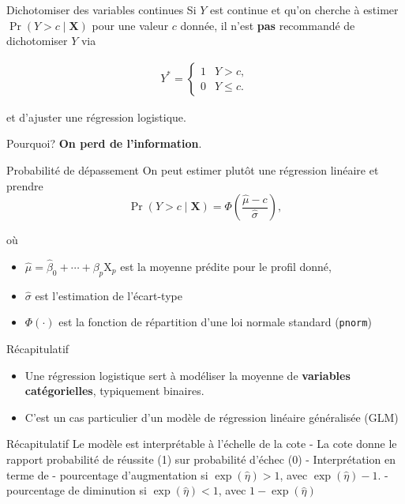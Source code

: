 \documentclass[
  ignorenonframetext,
]{beamer}
\providecommand{\tightlist}{%
  \setlength{\itemsep}{0pt}\setlength{\parskip}{0pt}}\usepackage{longtable,booktabs,array}
\begin{document}
\begin{frame}{Dichotomiser des variables continues}
\protect\hypertarget{dichotomiser-des-variables-continues}{}
Si \(Y\) est continue et qu'on cherche à estimer
\(\Pr(Y> c \mid \mathbf{X})\) pour une valeur \(c\) donnée, il n'est
\textbf{pas} recommandé de dichotomiser \(Y\) via

\begin{align*}
Y^{*} = \begin{cases}
1 & Y > c, \\
0 & Y \leq c.
\end{cases}
\end{align*}

et d'ajuster une régression logistique.

Pourquoi? \textbf{On perd de l'information}.
\end{frame}

\begin{frame}[fragile]{Probabilité de dépassement}
\protect\hypertarget{probabilituxe9-de-duxe9passement}{}
On peut estimer plutôt une régression linéaire et prendre
\[\Pr(Y > c \mid \mathbf{X}) = \Phi\left(\frac{\widehat{\mu}-c}{\widehat{\sigma}}\right),\]

où

\begin{itemize}
\tightlist
\item
  \(\widehat{\mu}=\widehat{\beta}_0 + \cdots + \beta_p\mathrm{X}_p\) est
  la moyenne prédite pour le profil donné,
\item
  \(\widehat{\sigma}\) est l'estimation de l'écart-type
\item
  \(\Phi(\cdot)\) est la fonction de répartition d'une loi normale
  standard (\texttt{pnorm})
\end{itemize}
\end{frame}

\begin{frame}{Récapitulatif}
\protect\hypertarget{ruxe9capitulatif}{}
\begin{itemize}
\tightlist
\item
  Une régression logistique sert à modéliser la moyenne de
  \textbf{variables catégorielles}, typiquement binaires.
\item
  C'est un cas particulier d'un modèle de régression linéaire
  généralisée (GLM)
\end{itemize}
\end{frame}

\begin{frame}{Récapitulatif}
\protect\hypertarget{ruxe9capitulatif-1}{}
Le modèle est interprétable à l'échelle de la cote - La cote donne le
rapport probabilité de réussite (1) sur probabilité d'échec (0) -
Interprétation en terme de - pourcentage d'augmentation si
\(\exp(\widehat{\eta}) > 1\), avec \(\exp(\widehat{\eta})-1\). -
pourcentage de diminution si \(\exp(\widehat{\eta}) < 1\), avec
\(1-\exp(\widehat{\eta})\)
\end{frame}
\end{document}
